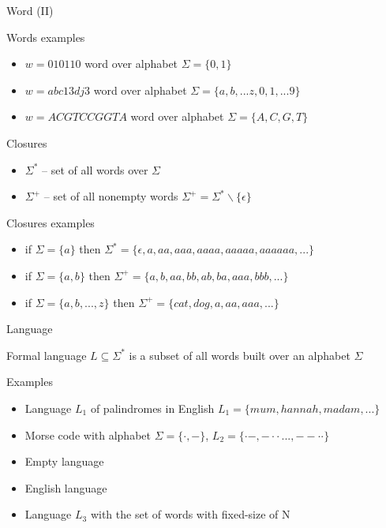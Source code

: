 \documentclass{beamer}
\begin{document}
\begin{frame}{Word (II)}

\begin{exampleblock}{Words examples}
\begin{itemize}
\item $w = 010110$ word over alphabet $\Sigma = \{0, 1\}$
\item $w = abc13dj3$ word over alphabet $\Sigma = \{a, b, ...z, 0, 1, ...9\}$
\item $w = ACGTCCGGTA$ word over alphabet $\Sigma = \{A, C, G, T\}$
\end{itemize}
\end{exampleblock}

\begin{block}{Closures}
\begin{itemize}
\item $\Sigma^{\ast}$ -- set of all words over $\Sigma$
\item $\Sigma^{+}$ -- set of all nonempty words $\Sigma^+=\Sigma^*\backslash\{\epsilon\}$
\end{itemize}
\end{block}

\begin{exampleblock}{Closures examples}
\begin{itemize}
\item if $\Sigma = \{a\}$ then $\Sigma^{\ast} = \{\epsilon, a, aa, aaa, aaaa, aaaaa, aaaaaa, ...\}$
\item if $\Sigma = \{a, b\}$ then $\Sigma^{+} = \{a, b, aa, bb, ab, ba, aaa, bbb, ...\}$
\item if $\Sigma = \{a, b, ..., z\}$ then $\Sigma^{+} = \{cat, dog, a, aa, aaa, ...\}$
\end{itemize}
\end{exampleblock}

\end{frame}

\begin{frame}{Language}
	
\begin{definition}{Formal language}
$L\subseteq\Sigma^{\ast}$ is a subset of all words built over an alphabet $\Sigma$
\end{definition}
	
\begin{exampleblock}{Examples}
\begin{itemize}
\item Language $L_1$ of palindromes in English $L_1 = \{mum, hannah, madam,...\}$
\item Morse code with alphabet $\Sigma=\{\cdot,	 -\}$, $L_2=\{\cdot -, - \cdot \cdot\,...,--\cdot\cdot\}$
\item Empty language
\item English language
\item Language $L_3$ with the set of words with fixed-size of N 
\end{itemize}
\end{exampleblock}
\end{frame}
\end{document}
